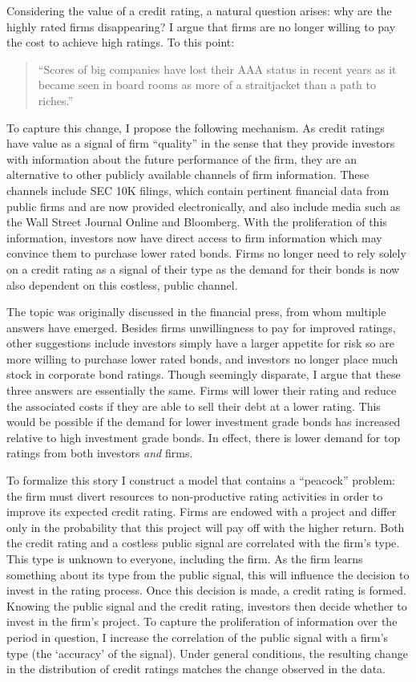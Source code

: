 \documentclass[notitlepage]{article}
\begin{document}
Considering the value of a credit rating, a natural question arises: why are the highly rated firms disappearing? I argue that firms are no longer willing to pay the cost to achieve high ratings. To this point:
\begin{quote}
``Scores of big companies have lost their AAA status in recent years as it became seen in board rooms as more of a straitjacket than a path to riches.''
\end{quote}
To capture this change, I propose the following mechanism. As credit ratings have value as a signal of firm ``quality'' in the sense that they provide investors with information about the future performance of the firm, they are an alternative to other publicly available channels of firm information. These channels include SEC 10K filings, which contain pertinent financial data from public firms and are now provided electronically, and also include media such as the Wall Street Journal Online and Bloomberg. With the proliferation of this information, investors now have direct access to firm information which may convince them to purchase lower rated bonds. Firms no longer need to rely solely on a credit rating as a signal of their type as the demand for their bonds is now also dependent on this costless, public channel.

The topic was originally discussed in the financial press, from whom multiple answers have emerged. Besides firms unwillingness to pay for improved ratings, other suggestions include investors simply have a larger appetite for risk so are more willing to purchase lower rated bonds, and investors no longer place much stock in corporate bond ratings. Though seemingly disparate, I argue that these three answers are essentially the same. Firms will lower their rating and reduce the associated costs if they are able to sell their debt at a lower rating. This would be possible if the demand for lower investment grade bonds has increased relative to high investment grade bonds. In effect, there is lower demand for top ratings from both investors \emph{and} firms.

To formalize this story I construct a model that contains a ``peacock'' problem: the firm must divert resources to non-productive rating activities in order to improve its expected credit rating. Firms are endowed with a project and differ only in the probability that this project will pay off with the higher return. Both the credit rating and a costless public signal are correlated with the firm's type. This type is unknown to everyone, including the firm. As the firm learns something about its type from the public signal, this will influence the decision to invest in the rating process. Once this decision is made, a credit rating is formed. Knowing the public signal and the credit rating, investors then decide whether to invest in the firm's project. To capture the proliferation of information over the period in question, I increase the correlation of the public signal with a firm's type (the `accuracy' of the signal). Under general conditions, the resulting change in the distribution of credit ratings matches the change observed in the data.
\end{document}
